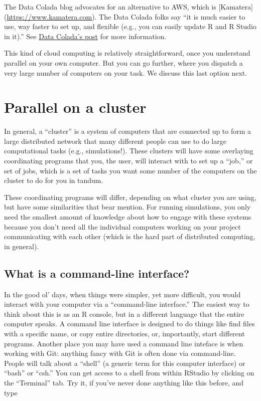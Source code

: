 \documentclass[
]{book}
\begin{document}
The Data Colada blog advocates for an alternative to AWS, which is {[}Kamatera{]} (\url{https://www.kamatera.com}).
The Data Colada folks say ``it is much easier to use, way faster to set up, and flexible (e.g., you can easily update R and R Studio in it).''
See \href{https://datacolada.org/102}{Data Colada's post} for more information.

This kind of cloud computing is relatively straightforward, once you understand parallel on your own computer.
But you can go further, where you dispatch a very large number of computers on your task.
We discuss this last option next.

\section{Parallel on a cluster}\label{parallel-on-a-cluster}

In general, a ``cluster'' is a system of computers that are connected up to form a large distributed network that many different people can use to do large computational tasks (e.g., simulations!).
These clusters will have some overlaying coordinating programs that you, the user, will interact with to set up a ``job,'' or set of jobs, which is a set of tasks you want some number of the computers on the cluster to do for you in tandum.

These coordinating programs will differ, depending on what cluster you are using, but have some similarities that bear mention.
For running simulations, you only need the smallest amount of knowledge about how to engage with these systems because you don't need all the individual computers working on your project communicating with each other (which is the hard part of distributed computing, in general).

\subsection{What is a command-line interface?}\label{what-is-a-command-line-interface}

In the good ol' days, when things were simpler, yet more difficult, you would interact with your computer via a ``command-line interface.''
The easiest way to think about this is as an R console, but in a different language that the entire computer speaks.
A command line interface is designed to do things like find files with a specific name, or copy entire directories, or, importantly, start different programs.
Another place you may have used a command line inteface is when working with Git: anything fancy with Git is often done via command-line.
People will talk about a ``shell'' (a generic term for this computer interface) or ``bash'' or ``csh.''
You can get access to a shell from within RStudio by clicking on the ``Terminal'' tab.
Try it, if you've never done anything like this before, and type
\end{document}
